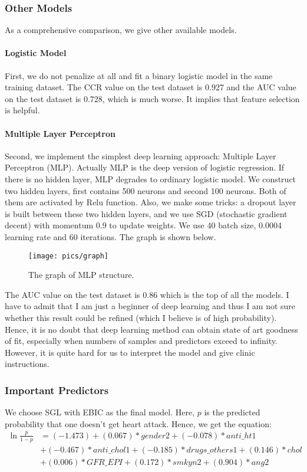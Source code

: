 \documentclass[]{article}
\begin{document}
\subsubsection{Other Models}
As a comprehensive comparison, we give other available models.

\paragraph{Logistic Model}First, we do not penalize at all and fit a binary logistic model in the same training dataset. The CCR value on the test dataset is 0.927 and the AUC value on the test dataset is 0.728, which is much worse. It implies that feature selection is helpful.

\paragraph{Multiple Layer Perceptron}Second, we implement the simplest deep learning approach: Multiple Layer Perceptron (MLP). Actually MLP is the deep version of logistic regression. If there is no hidden layer, MLP degrades to ordinary logistic model. We construct two hidden layers, first contains 500 neurons and second 100 neurons. Both of them are activated by Relu function. Also, we make some tricks: a dropout layer is built between these two hidden layers, and we use SGD (stochastic gradient decent) with momentum 0.9 to update weights. We use 40 batch size, 0.0004 learning rate and 60 iterations. The graph is shown below.
\begin{figure}[H]
	\centering
	\texttt{[image: pics/graph]}
	\caption{The graph of MLP structure.\label{graph}}
\end{figure}
The AUC value on the test dataset is 0.86 which is the top of all the models. I have to admit that I am just a beginner of deep learning and thus I am not sure whether this result could be refined (which I believe is of high probability). Hence, it is no doubt that deep learning method can obtain state of art goodness of fit, especially when numbers of samples and predictors exceed to infinity. However, it is quite hard for us to interpret the model and give clinic instructions.

\subsubsection{Important Predictors}
We choose SGL with EBIC as the final model. Here, $p$ is the predicted probability that one doesn't get heart attack. Hence, we get the equation:
\begin{align*}
\ln\frac{p}{1-p}&=(-1.473) + (0.067)*gender2 + ( -0.078)*anti\_ht1\\ &+
( -0.467)*anti\_chol1 + ( -0.185)*drugs\_others1 + (0.146)*chol \\ &+
(0.006)*GFR\_EPI + (0.172)*smkyn2 + (0.904)*ang2
\end{align*}
\end{document}
